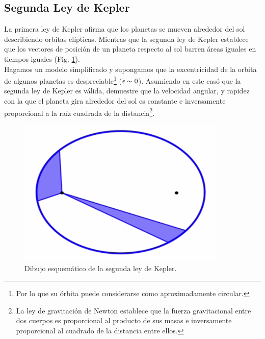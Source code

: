 \documentclass{replab}
\begin{document}
\subsection{Segunda Ley de Kepler}
La primera ley de Kepler afirma que los planetas se mueven alrededor del sol describiendo orbitas elípticas. Mientras que la segunda ley de Kepler establece que los vectores de posición de un planeta respecto al sol barren áreas iguales en tiempos iguales (Fig. \ref{fig:kepler}). \\

Hagamos un modelo simplificado y supongamos que la excentricidad de la orbita de algunos planetas es despreciable\footnote{Por lo que su órbita puede considerarse como aproximadamente circular.} ($\epsilon \thicksim 0$). Asumiendo en este casó que la segunda ley de Kepler es válida, demuestre que la velocidad angular, y rapidez con la que el planeta gira alrededor del sol es constante e inversamente proporcional a la raíz cuadrada de la distancia\footnote{La ley de gravitación de Newton establece que la fuerza gravitacional entre dos cuerpos es proporcional al producto de sus masas e inversamente proporcional al cuadrado de la distancia entre ellos.}.

\begin{figure}[htbp]
	\centering
	\includegraphics[width=.4\columnwidth]{imagenes/kepler.png}
	\caption{Dibujo esquemático de la segunda ley de Kepler.}
	\label{fig:kepler}
\end{figure}

	\printbibliography[heading=bibintoc]
	
\end{document}
